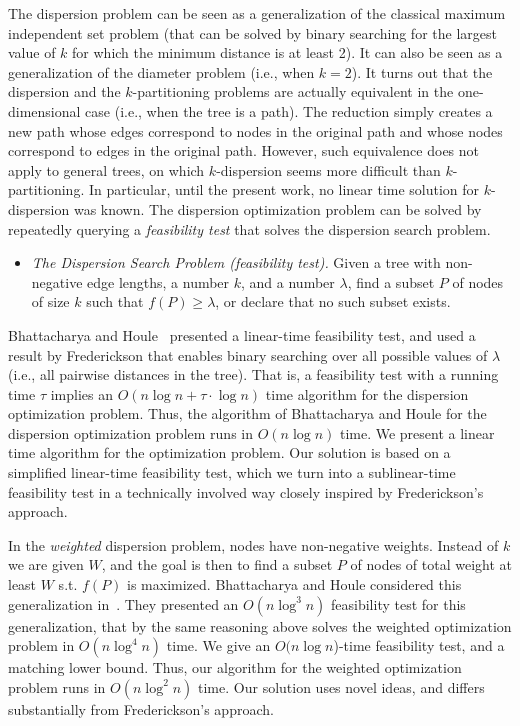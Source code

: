 \documentclass[11pt,a4paper]{article}
\theoremstyle{definition}
\theoremstyle{remark}
\begin{document}
\noindent The dispersion problem can be seen as a generalization of the classical maximum independent set problem (that can be solved by binary searching for the largest value of $k$ for which the minimum distance is at least 2).  It can also be seen as a generalization of the diameter problem (i.e., when $k=2$).
%
It turns out that the dispersion and the $k$-partitioning problems are actually equivalent in the one-dimensional case (i.e., when the tree is a path). The reduction simply creates a new path whose edges correspond to nodes in the original path and whose nodes correspond to edges in the original path. However, such equivalence does not apply to general trees, on which $k$-dispersion seems more difficult than $k$-partitioning. In particular, until the present work, no linear time solution for $k$-dispersion was known. 
The dispersion optimization problem can be solved by repeatedly querying a {\em feasibility test} that solves the dispersion search problem. 

\begin{itemize}
\item  {\em The Dispersion Search Problem (feasibility test).}  Given a tree with non-negative edge lengths, a number $k$, and a number $\lambda$, find a subset $P$ of nodes of size $k$ such that  $f(P)\geq\lambda$, or declare that no such subset exists. 
\end{itemize}

\noindent Bhattacharya and Houle~\cite{Bhattacharya1991} presented a linear-time feasibility test, and used a result by Frederickson \cite{Frederickson1983} that enables binary searching over all possible values of $\lambda$ (i.e., all pairwise distances in the tree). That is, a feasibility test with a running time $\tau$ implies an $O(n \log n + \tau \cdot \log n)$ time algorithm for the dispersion optimization problem. Thus, the algorithm of Bhattacharya and Houle for the dispersion optimization problem runs in $O(n\log n)$ time. We present a linear time algorithm for the optimization problem. Our solution is based on a simplified linear-time feasibility test, which we turn into a sublinear-time feasibility test in a technically involved way closely inspired by Frederickson's approach.

In the {\em weighted} dispersion problem, nodes have non-negative weights. Instead of $k$ we are given $W$, and the goal is then to find a subset
$P$ of nodes of total weight at least $W$ s.t. $f(P)$ is maximized. Bhattacharya and Houle considered this generalization in~\cite{Bhattacharya1999}. They presented an $O(n \log^3 n)$ feasibility test for this generalization, that by the same reasoning above solves the weighted optimization problem in $O(n \log^4 n)$ time. We give an $O(n \log n$)-time feasibility test, and a matching lower bound.  Thus, our algorithm for the weighted optimization problem runs in $O(n \log^2 n)$ time. Our solution uses novel ideas, and differs substantially from Frederickson's approach.
\end{document}
